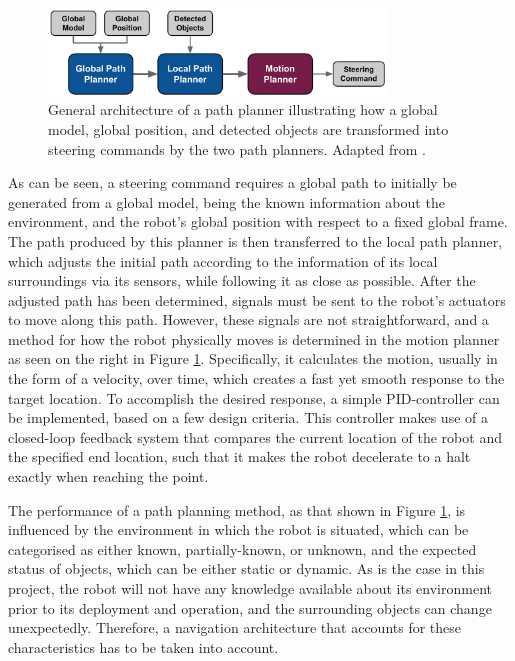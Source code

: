 
\begin{figure}[H]
    \centering
    \includegraphics[width=0.8\textwidth]{figures/1Problem_analysis/General Path Planning.pdf}
    \caption{General architecture of a path planner illustrating how a global model, global position, and detected objects are transformed into steering commands by the two path planners. Adapted from \cite{PathPlanning:introduction_to_MR}.}
    \label{fig:path_planner}
\end{figure}

As can be seen, a steering command requires a global path to initially be generated from a global model, being the known information about the environment, and the robot's global position with respect to a fixed global frame. The path produced by this planner is then transferred to the local path planner, which adjusts the initial path according to the information of its local surroundings via its sensors, while following it as close as possible. After the adjusted path has been determined, signals must be sent to the robot's actuators to move along this path. However, these signals are not straightforward, and a method for how the robot physically moves is determined in the motion planner as seen on the right in Figure \ref{fig:path_planner}. Specifically, it calculates the motion, usually in the form of a velocity, over time, which creates a fast yet smooth response to the target location. To accomplish the desired response, a simple \gls{PID}-controller can be implemented, based on a few design criteria. This controller makes use of a closed-loop feedback system that compares the current location of the robot and the specified end location, such that it makes the robot decelerate to a halt exactly when reaching the point. 

The performance of a path planning method, as that shown in Figure \ref{fig:path_planner}, is influenced by the environment in which the robot is situated, which can be categorised as either known, partially-known, or unknown, and the expected status of objects, which can be either static or dynamic. As is the case in this project, the robot will not have any knowledge available about its environment prior to its deployment and operation, and the surrounding objects can change unexpectedly. Therefore, a navigation architecture that accounts for these characteristics has to be taken into account. 

